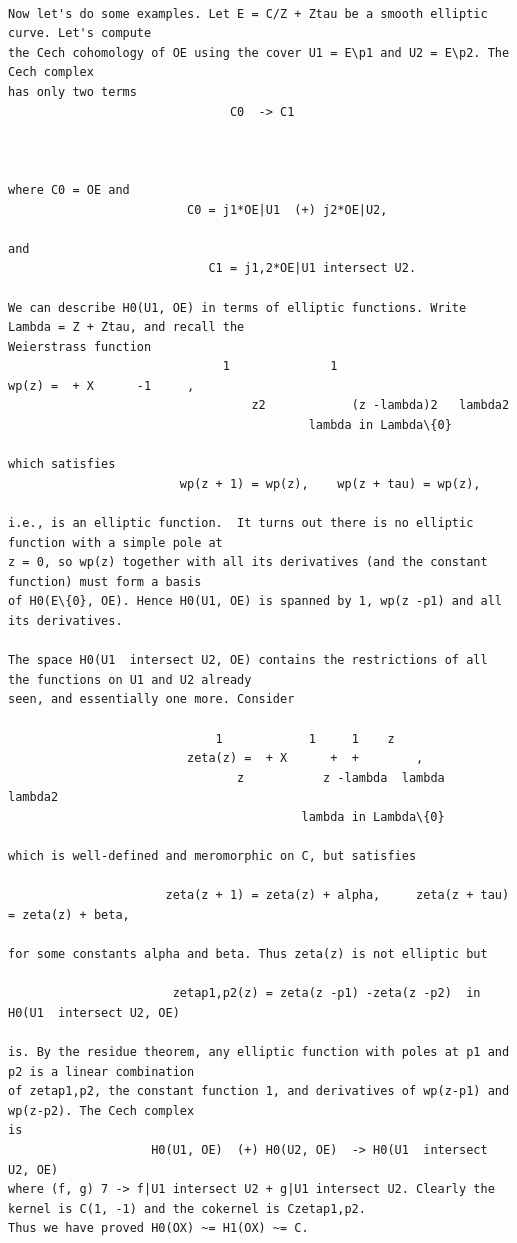 \begin{Verbatim}[fontsize=\footnotesize]

Now let's do some examples. Let E = C/Z + Ztau be a smooth elliptic curve. Let's compute
the Cech cohomology of OE using the cover U1 = E\p1 and U2 = E\p2. The Cech complex
has only two terms
                               C0  -> C1



where C0 = OE and
                         C0 = j1*OE|U1  (+) j2*OE|U2,

and
                            C1 = j1,2*OE|U1 intersect U2.

We can describe H0(U1, OE) in terms of elliptic functions. Write Lambda = Z + Ztau, and recall the
Weierstrass function
                              1              1                        wp(z) =  + X      -1     ,
                                  z2            (z -lambda)2   lambda2
                                          lambda in Lambda\{0}

which satisfies
                        wp(z + 1) = wp(z),    wp(z + tau) = wp(z),

i.e., is an elliptic function.  It turns out there is no elliptic function with a simple pole at
z = 0, so wp(z) together with all its derivatives (and the constant function) must form a basis
of H0(E\{0}, OE). Hence H0(U1, OE) is spanned by 1, wp(z -p1) and all its derivatives.

The space H0(U1  intersect U2, OE) contains the restrictions of all the functions on U1 and U2 already
seen, and essentially one more. Consider

                             1            1     1    z
                         zeta(z) =  + X      +  +        ,
                                z           z -lambda  lambda   lambda2
                                         lambda in Lambda\{0}

which is well-defined and meromorphic on C, but satisfies

                      zeta(z + 1) = zeta(z) + alpha,     zeta(z + tau) = zeta(z) + beta,

for some constants alpha and beta. Thus zeta(z) is not elliptic but

                       zetap1,p2(z) = zeta(z -p1) -zeta(z -p2)  in H0(U1  intersect U2, OE)

is. By the residue theorem, any elliptic function with poles at p1 and p2 is a linear combination
of zetap1,p2, the constant function 1, and derivatives of wp(z-p1) and wp(z-p2). The Cech complex
is
                    H0(U1, OE)  (+) H0(U2, OE)  -> H0(U1  intersect U2, OE)
where (f, g) 7 -> f|U1 intersect U2 + g|U1 intersect U2. Clearly the kernel is C(1, -1) and the cokernel is Czetap1,p2.
Thus we have proved H0(OX) ~= H1(OX) ~= C.


\end{Verbatim}
